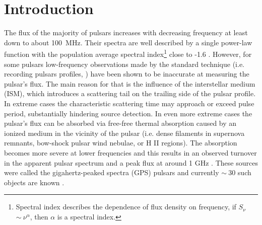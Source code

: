 \documentclass[manuscript]{aastex63}
\begin{document}

\section{Introduction} \label{sec:intro}

The flux of the majority of pulsars increases with decreasing frequency at least down to about 100~MHz. Their spectra are well described by a single power-law function with the population average spectral index\footnote{Spectral index describes the dependence of flux density on frequency, if $S_{\nu}$  $\sim~\nu^{\alpha}$, then $\alpha$ is a spectral index.} close to -1.6 \citep{1995Lorimer,2017Jankowski}. However, for some pulsars low-frequency observations made by the standard technique (i.e. recording pulsars profiles, \citealt{2012Lorimer}) have been shown to be inaccurate at measuring the pulsar's flux. The main reason for that is the influence of the interstellar medium
(ISM), which introduces a scattering tail on the trailing side of the pulsar profile. In extreme cases the characteristic scattering time may approach or exceed pulse period, substantially hindering source detection. In even more extreme cases the pulsar's flux can be absorbed via free-free thermal absorption caused by an ionized medium in the vicinity of the pulsar (i.e. dense filaments in supernova remnants, bow-shock pulsar wind nebulae, or H II regions). The absorption becomes more severe at lower frequencies and this results in an observed turnover in the apparent pulsar spectrum and a peak flux at around 1 GHz \citep{2011KijakA,2011KijakB,2013Kijak,2017Kijak}. These sources were called the gigahertz-peaked spectra (GPS) pulsars and currently $\sim~30$ such objects are known \citep[see][and references therein]{2015Dembska,2016Basu,2018Basu,2017Kijak,2018Kijak,2017Jankowski}.
\end{document}
